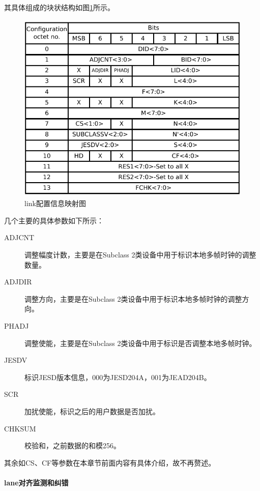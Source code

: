 \documentclass[UTF8]{ctexart}
\begin{document}
其具体组成的块状结构如图\ref{fig:mapping_link_configuration_fields}所示。

\begin{figure}[H]
	\centering
	\includegraphics[width=16cm]{./img/mapping_link_configuration_fields.pdf}
	\caption{link配置信息映射图}
	\label{fig:mapping_link_configuration_fields}
\end{figure}

几个主要的具体参数如下所示：

\begin{description}
  \item[ADJCNT] 调整幅度计数，主要是在Subclass 2类设备中用于标识本地多帧时钟的调整数量。
  \item[ADJDIR] 调整方向，主要是在Subclass 2类设备中用于标识本地多帧时钟的调整方向。
  \item[PHADJ] 调整使能，主要是在Subclass 2类设备中用于标识是否调整本地多帧时钟。
  \item[JESDV] 标识JESD版本信息，000为JESD204A，001为JEAD204B。
  \item[SCR] 加扰使能，标识之后的用户数据是否加扰。
  \item[CHKSUM] 校验和，之前数据的和模256。
\end{description}

其余如CS、CF等参数在本章节前面内容有具体介绍，故不再赘述。

\paragraph{lane对齐监测和纠错}
\end{document}
